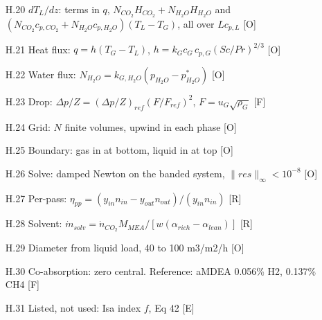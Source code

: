 \begin{enumerate}[leftmargin=1.4cm,itemsep=0pt,topsep=2pt,parsep=0pt]
\item[H.20] $dT_L/dz$: terms in $q$, $N_{CO_2}H_{CO_2}+N_{H_2O}H_{H_2O}$ and $(N_{CO_2}c_{p,CO_2}+N_{H_2O}c_{p,H_2O})(T_L-T_G)$, all over $Lc_{p,L}$ {\footnotesize [O]}
\item[H.21] Heat flux: $q=h(T_G-T_L)$, $h=k_Gc_G\,c_{p,G}(Sc/Pr)^{2/3}$ {\footnotesize [O]}
\item[H.22] Water flux: $N_{H_2O}=k_{G,H_2O}(p_{H_2O}-p^*_{H_2O})$ {\footnotesize [O]}
\item[H.23] Drop: $\Delta p/Z=(\Delta p/Z)_{ref}(F/F_{ref})^2$, $F=u_G\sqrt{\rho_G}$ {\footnotesize [F]}
\item[H.24] Grid: $N$ finite volumes, upwind in each phase {\footnotesize [O]}
\item[H.25] Boundary: gas in at bottom, liquid in at top {\footnotesize [O]}
\item[H.26] Solve: damped Newton on the banded system, $\lVert res\rVert_\infty<10^{-8}$ {\footnotesize [O]}
\item[H.27] Per-pass: $\eta_{pp}=(y_{in}n_{in}-y_{out}n_{out})/(y_{in}n_{in})$ {\footnotesize [R]}
\item[H.28] Solvent: $\dot m_{solv}=\dot n_{CO_2}M_{MEA}/[w(\alpha_{rich}-\alpha_{lean})]$ {\footnotesize [R]}
\item[H.29] Diameter from liquid load, 40 to 100 m3/m2/h {\footnotesize [O]}
\item[H.30] Co-absorption: zero central. Reference: aMDEA 0.056\% H2, 0.137\% CH4 {\footnotesize [F]}
\item[H.31] Listed, not used: Isa index $f$, Eq 42 {\footnotesize [E]}
\end{enumerate}
